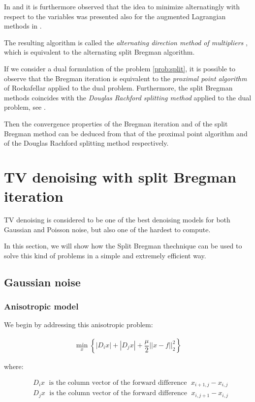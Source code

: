 In \citep{deblurring} and \citep{operator} it is furthermore observed that the idea to minimize alternatingly with respect to the variables was presented also for the augmented Lagrangian methods in \citep{gabaymercier} \citep{glowinski}.

The resulting algorithm is called the \emph{alternating direction method of multipliers} \citep{gabay}, which is equivalent to the alternating split Bregman algorithm.

If we consider a dual formulation of the problem \eqref{prob:split}, it is possible to observe that the Bregman iteration is equivalent to the \emph{proximal point algorithm} of Rockafellar applied to the dual problem. Furthermore, the split Bregman methods coincides with the \emph{Douglas Rachford splitting method} applied to the dual problem, see \citep{Eckstein}.

Then the convergence properties of the Bregman iteration and of the split Bregman method can be deduced from that of the proximal point algorithm and of the Douglas Rachford splitting method respectively.

\section{TV denoising with split Bregman iteration}

TV denoising is considered to be one of the best denoising models for both Gaussian and Poisson noise, but also one of the hardest to compute.

In this section, we will show how the Split Bregman thechnique can be used to solve this kind of problems in a simple and extremely efficient way.

\subsection{Gaussian noise}
\subsubsection{Anisotropic model}

We begin by addressing this anisotropic problem:

\begin{align}
\label{an:prob} \min_x \left\{ |D_i x| + |D_j x| + \dfrac{\mu}{2} ||x-f||_2^2\right\}
\end{align}

where:

\begin{align*}
&D_i x\;\mbox{ is the column vector of the forward difference }\;x_{i+1,j}-x_{i,j}\\
&D_j x \;\mbox{ is the column vector of the forward difference }\;x_{i,j+1}-x_{i,j}
\end{align*}

